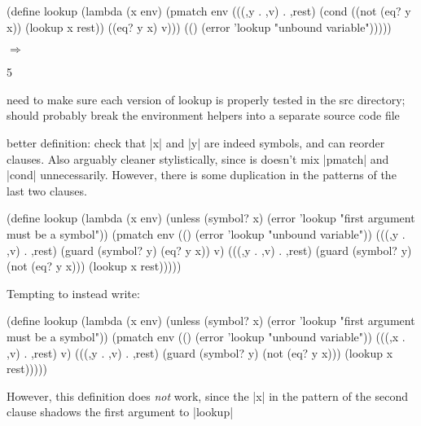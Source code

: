 \begin{schemedisplay}
(define lookup
  (lambda (x env)
    (pmatch env
      (((,y . ,v) . ,rest)
       (cond
         ((not (eq? y x)) (lookup x rest))
         ((eq? y x) v)))
      (() (error 'lookup "unbound variable")))))
\end{schemedisplay}

\noindent{} $\Rightarrow$
\begin{schemeresponsebox}5\end{schemeresponsebox}

need to make sure each version of lookup is properly tested in the src directory;
should probably break the environment helpers into a separate source code file


better definition: check that \scheme|x| and \scheme|y| are indeed
symbols, and can reorder clauses.  Also arguably cleaner
stylistically, since is doesn't mix \scheme|pmatch| and \scheme|cond|
unnecessarily.  However, there is some duplication in the patterns of
the last two clauses.

\begin{schemedisplay}
(define lookup
  (lambda (x env)
    (unless (symbol? x)
      (error 'lookup "first argument must be a symbol"))
    (pmatch env
      (() (error 'lookup "unbound variable"))
      (((,y . ,v) . ,rest) (guard (symbol? y) (eq? y x))
       v)
      (((,y . ,v) . ,rest) (guard (symbol? y) (not (eq? y x)))
       (lookup x rest)))))
\end{schemedisplay}

Tempting to instead write:

\begin{schemedisplay}
(define lookup
  (lambda (x env)
    (unless (symbol? x)
      (error 'lookup "first argument must be a symbol"))
    (pmatch env
      (() (error 'lookup "unbound variable"))
      (((,x . ,v) . ,rest)
       v)
      (((,y . ,v) . ,rest) (guard (symbol? y) (not (eq? y x)))
       (lookup x rest)))))
\end{schemedisplay}

However, this definition does \emph{not} work, since the \scheme|x| in
the pattern of the second clause shadows the first argument to
\scheme|lookup|

